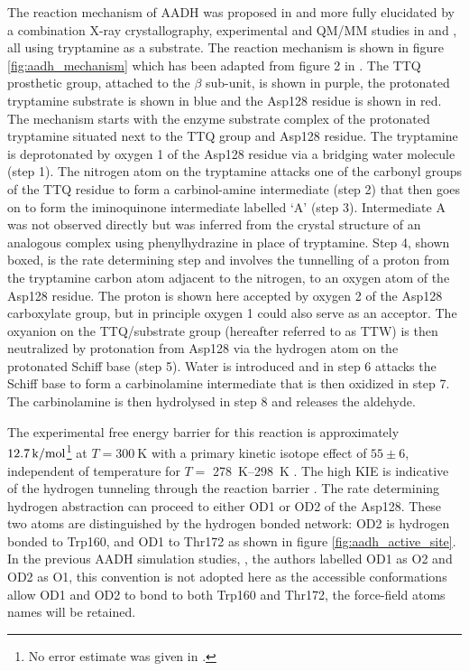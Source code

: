 The reaction mechanism of AADH was proposed in \cite{hyunMechanisticStudiesAromatic1995a} and more fully elucidated by a combination X-ray crystallography, experimental and QM/MM studies in \cite{masgrauAtomicDescriptionEnzyme2006}\cite{masgrauTunnelingClassicalPaths2007} and \cite{ranaghanInitioQMMM2017}, all using tryptamine as a substrate. 
The reaction mechanism is shown in figure \ref{fig:aadh_mechanism} which has been adapted from figure 2 in \cite{masgrauAtomicDescriptionEnzyme2006}. The TTQ prosthetic group, attached to the $\beta$ sub-unit, is shown in purple, the protonated tryptamine substrate is shown in blue and the Asp128 residue is shown in red.  The mechanism starts with the enzyme substrate complex of the protonated tryptamine situated next to the TTQ group and Asp128 residue.  The tryptamine is deprotonated by oxygen 1 of the Asp128 residue via a bridging water molecule (step 1).  The nitrogen atom on the tryptamine attacks one of the carbonyl groups of the TTQ residue to form a carbinol-amine intermediate (step 2) that then goes on to form the iminoquinone intermediate labelled `A' (step 3).  Intermediate A was not observed directly but was inferred from the crystal structure of an analogous complex using phenylhydrazine in place of tryptamine.  Step 4, shown boxed, is the rate determining step and involves the tunnelling of a proton from the tryptamine carbon atom adjacent to the nitrogen, to an oxygen atom of the Asp128 residue.  The proton is shown here accepted by oxygen 2 of the Asp128 carboxylate group, but in principle oxygen 1 could also serve as an acceptor. The oxyanion on the TTQ/substrate group (hereafter referred to as TTW) is then neutralized by protonation from Asp128 via the hydrogen atom on the protonated Schiff base (step 5). Water is introduced and in step 6 attacks the Schiff base to form a carbinolamine intermediate that is then oxidized in step 7.  The carbinolamine is then hydrolysed in step 8 and releases the aldehyde.  


The experimental free energy barrier for this reaction is approximately $ \SI{12.7}{\kilo\cal\per\mol}$\footnote{No error estimate was given in \cite{masgrauAtomicDescriptionEnzyme2006}.} at $T=\SI{300}{\kelvin}$ with a primary kinetic isotope effect of $55 \pm 6$, independent of temperature for $T =$ \SIrange{278}{298}{\kelvin} \cite{masgrauAtomicDescriptionEnzyme2006}. The high KIE is indicative of the hydrogen tunneling through the reaction barrier  \cite{masgrauAtomicDescriptionEnzyme2006}\cite{kohenEnzymeCatalysisClassical1998}\cite{antoniouInternalEnzymeMotions2001}\cite{antoniouLargeKineticIsotope1997}\cite{allemannQuantumTunnellingEnzymecatalysed2009}. The rate determining hydrogen abstraction can proceed to either OD1 or OD2 of the Asp128. These two atoms are distinguished by the hydrogen bonded network: OD2 is hydrogen bonded to Trp160, and OD1 to Thr172 as shown in figure \ref{fig:aadh_active_site}. In the previous AADH simulation studies,  \cite{masgrauAtomicDescriptionEnzyme2006}\cite{masgrauTunnelingClassicalPaths2007}\cite{ranaghanInitioQMMM2017}, the authors labelled OD1 as O2 and OD2 as O1, this convention is not adopted here as the accessible conformations allow OD1 and OD2 to bond to both Trp160 and Thr172, the force-field atoms names will be retained. 

